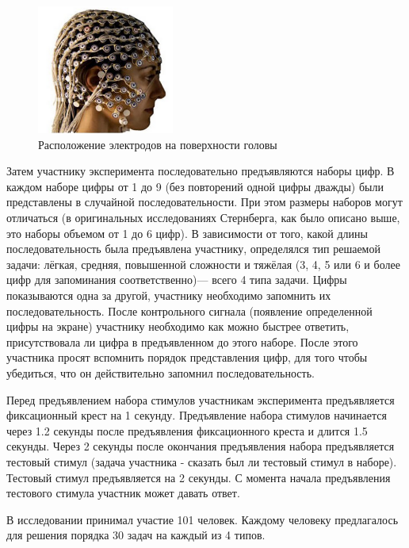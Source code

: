 \begin{figure}
    \centering
    \includegraphics[width=0.4\textwidth]{images/2.png}
    \caption{Расположение электродов на поверхности головы}
    \label{fig_2}
\end{figure}

Затем участнику эксперимента последовательно предъявляются наборы цифр.
В каждом наборе цифры от 1 до 9 (без повторений одной цифры дважды) были представлены в случайной
последовательности. При этом размеры наборов могут отличаться (в оригинальных исследованиях
Стернберга, как было описано выше, это наборы объемом от 1 до 6 цифр). В зависимости от того,
какой длины последовательность была предъявлена участнику, определялся тип решаемой задачи:
лёгкая, средняя, повышенной сложности и тяжёлая (3, 4, 5 или 6 и более цифр для запоминания
соответственно)--- всего 4 типа задачи. Цифры показываются одна
за другой, участнику необходимо запомнить их последовательность. После контрольного сигнала
(появление определенной цифры на экране) участнику необходимо как можно быстрее ответить,
присутствовала ли цифра в предъявленном до этого наборе. После этого участника просят вспомнить
порядок представления цифр, для того чтобы убедиться, что он действительно запомнил
последовательность.

Перед предъявлением набора стимулов участникам эксперимента предъявляется фиксационный крест
на 1 секунду. Предъявление набора стимулов начинается через 1.2 секунды после предъявления
фиксационного креста и длится 1.5 секунды. Через 2 секунды после окончания предъявления набора
предъявляется тестовый стимул (задача участника - сказать был ли тестовый стимул в наборе).
Тестовый стимул предъявляется на 2 секунды. С момента начала предъявления тестового стимула
участник может давать ответ.

В исследовании принимал участие 101 человек. Каждому человеку предлагалось для решения порядка
30 задач на каждый из 4 типов.